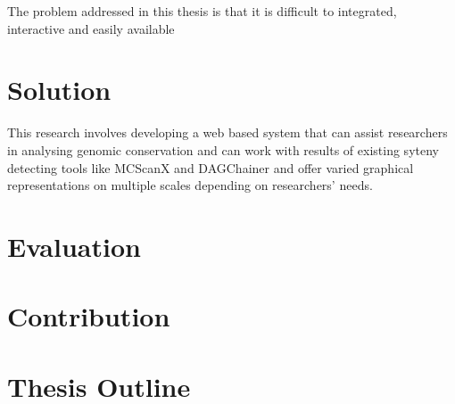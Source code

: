 The problem addressed in this thesis is that it is difficult to integrated, interactive and easily available

\section{Solution}
This research involves developing a web based system that can assist researchers in analysing genomic conservation and can work with results of existing syteny detecting tools like MCScanX and DAGChainer and offer varied graphical representations on multiple scales depending on researchers' needs.

\section{Evaluation}

\section{Contribution}

\section{Thesis Outline}